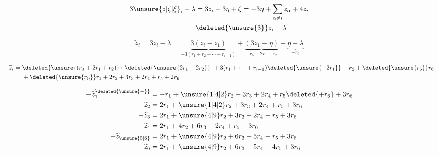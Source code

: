 
\deleted{%
\[
\begin{aligned}
&\deleted{x-w}&&r_0-2r_1-r_2+r_6\\
&\deleted{x-s_r(x)}\\
&s_r(x):x+(r,x)r&&r_1+2r_2+3r_3+2r_4+r_5+3r_6\\
&s_r(x)-x=(r,x)r\\
&(r,x)\in\{0,1,-1\}&&\alpha_1\\
&(\deleted{x-y}\quad s_rx-x=\\
&\deleted{x-wx=}\\
&wx=x+\rho\qquad \rho\ \text{\unsure{racine|vecteur}}\\
&s_rwx=s_rx+s_r\rho=x+\underbrace{(x,r)}_{\varepsilon}r+s_r\rho\\
&a)\ (x,r)=0\quad\text{i.e. }s_rx=x\quad\text{\unsure{on gagne}}\\
&b)\ (x,r)=1\\
&\quad\text{\unsure{on trouve}}\quad s_rwx-x=s_r\rho+r
\end{aligned}
\]
}

\[
\begin{aligned}
3\unsure{z|\zeta|\xi}_i-\lambda&=3z_i-3\eta+\zeta=-3\eta+\sum_{\alpha\ne i}z_\alpha+4z_i\\
&\deleted{\unsure{3}}z_i-\lambda
\end{aligned}
\]

\[
\widetilde z_i=3z_i-\lambda
=\underbrace{3(z_i-z_1)}_{-3(r_1+r_2+\cdots+r_{i-1})}
+\underbrace{(3z_1-\eta)}_{-r_6+2r_1+r_2}
+\underbrace{\eta-\lambda}_{-r_0}
\]

\[
\begin{aligned}
-\widetilde z_i={}&\deleted{\unsure{(r_0+2r_1+r_2)}}\ \deleted{\unsure{2r_1+2r_2}}\
+3(r_1+\cdots+r_{i-1})\deleted{\unsure{+2r_1}}-r_2+\deleted{\unsure{r_6}}r_6\\
&+\deleted{\unsure{r_0}}r_1+2r_2+3r_3+2r_4+r_5+2r_6
\end{aligned}
\]

\[
\begin{aligned}
-\widetilde z_1^{\deleted{\unsure{-}}}&=-r_1+\unsure{1|4|2}r_2+3r_3+2r_4+r_5\deleted{+r_6}+3r_6\\
-\widetilde z_{2}&=2r_1+\unsure{1|4|2}r_2+3r_3+2r_4+r_5+3r_6\\
-\widetilde z_3&=2r_1+\unsure{4|9}r_2+3r_3+2r_4+r_5+3r_6\\
-\widetilde z_4&=2r_1+4r_2+6r_3+2r_4+r_5+3r_6\\
-\widetilde z_{\unsure{5|6}}&=2r_1+\unsure{4|9}r_2+6r_3+5r_4+r_5+3r_6\\
-\widetilde z_6&=2r_1+\unsure{4|9}r_2+6r_3+5r_4+4r_5+3r_6
\end{aligned}
\]

